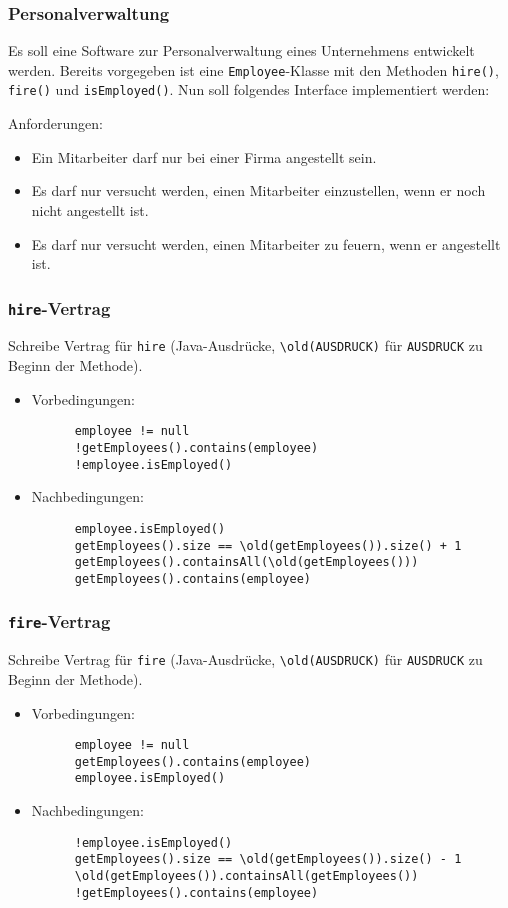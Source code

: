 \documentclass{beamer}
\begin{document}
\begin{frame}
  \frametitle{Personalverwaltung}
  Es soll eine Software zur Personalverwaltung eines Unternehmens entwickelt werden.
  Bereits vorgegeben ist eine \lstinline{Employee}-Klasse
  mit den Methoden \lstinline{hire()}, \lstinline{fire()} und \lstinline{isEmployed()}.
  Nun soll folgendes Interface implementiert werden:
  
  Anforderungen:
  \begin{itemize}
  \item
    Ein Mitarbeiter darf nur bei einer Firma angestellt sein.
  \item
    Es darf nur versucht werden, einen Mitarbeiter einzustellen, wenn er noch nicht angestellt ist.
  \item
    Es darf nur versucht werden, einen Mitarbeiter zu feuern, wenn er angestellt ist.
  \end{itemize}
\end{frame}

\begin{frame}[fragile]
  \frametitle{\lstinline{hire}-Vertrag}
  Schreibe Vertrag für \lstinline{hire}
  (Java-Ausdrücke, \lstinline{\old(AUSDRUCK)} für \lstinline{AUSDRUCK} zu Beginn der Methode).
  \begin{itemize}
  \item Vorbedingungen:\pause
    \begin{lstlisting}
      employee != null
      !getEmployees().contains(employee)
      !employee.isEmployed()
    \end{lstlisting}
  \item Nachbedingungen:\pause
    \begin{lstlisting}
      employee.isEmployed()
      getEmployees().size == \old(getEmployees()).size() + 1
      getEmployees().containsAll(\old(getEmployees()))
      getEmployees().contains(employee)
    \end{lstlisting}
  \end{itemize}
\end{frame}

\begin{frame}[fragile]
  \frametitle{\lstinline{fire}-Vertrag}
  Schreibe Vertrag für \lstinline{fire}
  (Java-Ausdrücke, \lstinline{\old(AUSDRUCK)} für \lstinline{AUSDRUCK} zu Beginn der Methode).
  \begin{itemize}
  \item Vorbedingungen:\pause
    \begin{lstlisting}
      employee != null
      getEmployees().contains(employee)
      employee.isEmployed()
    \end{lstlisting}
  \item Nachbedingungen:\pause
    \begin{lstlisting}
      !employee.isEmployed()
      getEmployees().size == \old(getEmployees()).size() - 1
      \old(getEmployees()).containsAll(getEmployees())
      !getEmployees().contains(employee)
    \end{lstlisting}
  \end{itemize}
\end{frame}
\end{document}
